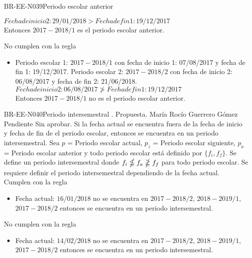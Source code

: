\begin{BusinessRule}{BR-EE-N039}{Periodo escolar anterior}
\begin{itemize}
		$Fecha de inicio 2: 29/01/2018 > Fecha de fin 1: 19/12/2017$\\
		Entonces $2017-2018/1$ es el periodo escolar anterior.
	\end{itemize}
	 No cumplen con la regla
	\begin{itemize}
		\item Periodo escolar 1: $2017-2018/1$ con fecha de inicio 1: 07/08/2017 y fecha de fin 1: 19/12/2017. Periodo escolar 2: $2017-2018/2$ con fecha de inicio 2: 06/08/2017 y fecha de fin 2: 21/06/2018.\\
		$Fecha de inicio 2: 06/08/2017 \ngtr Fecha de fin 1: 19/12/2017$\\
		Entonces $2017-2018/1$ no es el periodo escolar anterior.
	\end{itemize}
\end{BusinessRule}

\begin{BusinessRule}{BR-EE-N040}{Periodo intersemestral}
	{\bcIntegridad}    %
	{\btEnabler}     %
	{\blControlling}    %
	.
	\BRItem[Estado] Propuesta.
	 María Rocío Guerrero Gómez
	 Pendiente
	 Sin aprobar.
	\BRItem[Descripción] Si la fecha actual se encuentra fuera de la fecha de inicio y fecha de fin de el periodo escolar, entonces se encuentra en un periodo intersemestral.
	\BRItem[Sentencia]  
	Sea $p$ = Periodo escolar actual, $p_{z}$ = Periodo escolar siguiente, $p_{a}$ = Periodo escolar anterior y todo periodo escolar está definido por $\{f_{i},f_{f}\}$. Se define un periodo intersemestral donde $f_{i} \nleqq f_{a} \ngeqq f_{f}$ para todo periodo escolar.
	\BRItem[Motivación] Se requiere definir el periodo intersemestral dependiendo de la fecha actual.
	 Cumplen con la regla
	\begin{itemize}
		\item Fecha actual: $16/01/2018$ no se encuentra en $2017-2018/2$, $2018-2019/1$, $2017-2018/2$ entonces se encuentra en un periodo intersemestral.
	\end{itemize}
	 No cumplen con la regla
	\begin{itemize}
		\item Fecha actual: $14/02/2018$ no se encuentra en $2017-2018/2$, $2018-2019/1$, $2017-2018/2$ entonces se encuentra en un periodo intersemestral.
	\end{itemize}
\end{BusinessRule}

